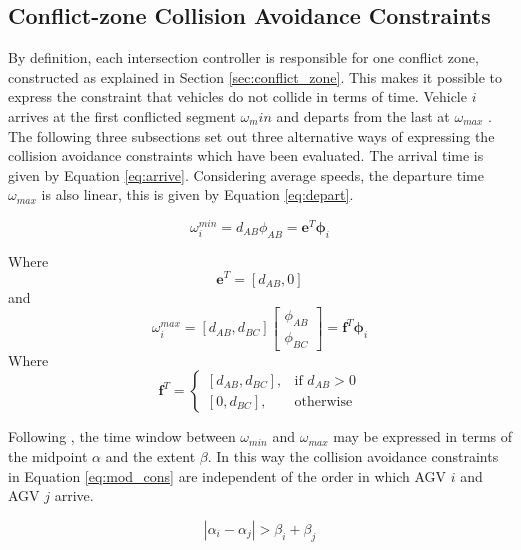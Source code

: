 \subsection{Conflict-zone Collision Avoidance Constraints} 
By definition, each intersection controller is responsible for one conflict zone, constructed as explained in Section \ref{sec:conflict_zone}. This makes it
possible to express the constraint that vehicles do not collide
in terms of time. Vehicle $i$ arrives at the first conflicted
segment $\omega_min$ and departs from the last at $\omega_{max}$ . The following three subsections set out three alternative ways
of expressing the collision avoidance constraints which have
been evaluated. The arrival time is given by Equation \ref{eq:arrive}. Considering average speeds, the departure time $\omega_{max}$ is also linear, this is given by Equation \ref{eq:depart}.

\begin{equation}
	\label{eq:arrive}
	\omega_i^{min} = d_{AB} \phi_{AB} = \bm{e}^T \bm{\phi}_i
\end{equation}

Where
\begin{equation}
	\label{eq:e_vec}
	\bm{e}^T = [d_{AB}, 0]
\end{equation}
and 
\begin{equation}
	\label{eq:depart}
	\omega_i^{max} = [d_{AB}, d_{BC}]\left[\begin{array}{c}
		\phi_{AB}\\
		\phi_{BC}
	\end{array}\right] = \bm{f}^T \bm{\phi}_i
\end{equation}
Where
\begin{equation}
	\label{eq:f_vec}
	\bm{f}^T = \begin{cases}
		[d_{AB}, d_{BC}],& \text{if } d_{AB}> 0\\
		[0, d_{BC}],              & \text{otherwise}
	\end{cases}
\end{equation}

Following \cite{Digani2019}, the time window between $\omega_{min}$ and $\omega_{max}$ may be expressed in terms of the midpoint $\alpha$ and the extent $\beta$. In this way the collision avoidance constraints in Equation \ref{eq:mod_cons} are independent of the order in which AGV $i$ and AGV $j$ arrive.

\begin{equation}
	\label{eq:mod_cons}
	|\alpha_i - \alpha_j|> \beta_i + \beta_j
\end{equation}

